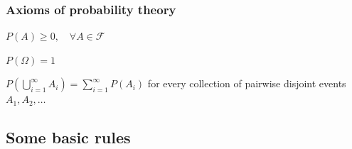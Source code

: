 \begin{frame}
\frametitle{Axioms of probability theory}


    \begin{probAxiom}

        $P(A)\ge 0,\quad\forall A\in\mathcal{F}$

    \end{probAxiom}

    \begin{probAxiom}

        $P(\Omega)=1$

    \end{probAxiom}

    \begin{probAxiom}

        $P\left(\bigcup_{i=1}^\infty A_i\right)=\sum_{i=1}^\infty P(A_i)$ for every collection of pairwise disjoint events $A_1,A_2,\ldots$

    \end{probAxiom}



\end{frame}

\subsection{Some basic rules}


